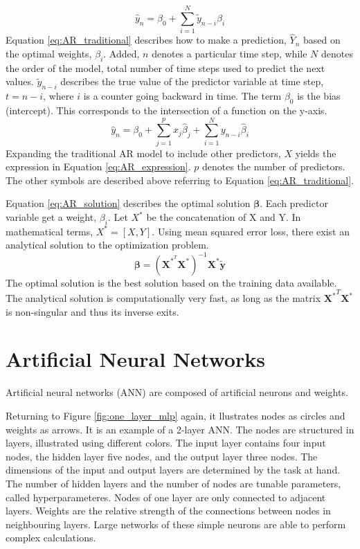\documentclass{article}
\begin{document}
\begin{equation} \label{eq:AR_traditional}
    \hat{y}_n = \beta_0 + \sum_{i = 1}^{N} \tilde{y}_{n-i} \beta_{i}
\end{equation}
Equation \eqref{eq:AR_traditional} describes how to make a prediction, $\hat{Y}_n$ based on the optimal weights, $\beta_i$. Added, $n$ denotes a particular time step, while $N$ denotes the order of the model, total number of time steps used to predict the next values. $\tilde{y}_{n-i}$ describes the true value of the predictor variable at time step, $t=n-i$, where $i$ is a counter going backward in time. The term $\beta_0$ is the bias (intercept). This corresponds to the intersection of a function on the y-axis.
\begin{equation} \label{eq:AR_expression}
    \hat{y}_n = \beta_0 + \sum_{j=1}^p x_j\hat{\beta}_j + \sum_{i = 1}^{N} y_{n-i}\hat{\beta}_{i}
\end{equation}
Expanding the traditional AR model to include other predictors, $X$ yields the expression in Equation \eqref{eq:AR_expression}. $p$ denotes the number of predictors. The other symbols are described above referring to Equation \eqref{eq:AR_traditional}.

Equation \eqref{eq:AR_solution} describes the optimal solution $\mathbf{\beta}$. Each predictor variable get a weight, $\beta_i$. Let $X^*$ be the concatenation of X and Y. In mathematical terms, $X^*=[X, Y]$. Using mean squared error loss, there exist an analytical solution to the optimization problem. 
\begin{equation} \label{eq:AR_solution}
    \mathbf{\beta}  = \left( \mathbf{X}^{*^T}\mathbf{X}^* \right)^{-1}\mathbf{X}^*\tilde{\mathbf{y}}
\end{equation}
The optimal solution is the best solution based on the training data available. The analytical solution is computationally very fast, as long as the matrix ${\mathbf{X}^*}^T\mathbf{X}^*$ is non-singular and thus its inverse exits.

\section{Artificial Neural Networks} \label{sec:artificial neural networks}
Artificial neural networks (ANN) are composed of artificial neurons and weights.  

Returning to Figure \ref{fig:one_layer_mlp} again, it llustrates nodes as circles and weights as arrows. It is an example of a 2-layer ANN. The nodes are structured in layers, illustrated using different colors. The input layer contains four input nodes, the hidden layer five nodes, and the output layer three nodes. The dimensions of the input and output layers are determined by the task at hand. The number of hidden layers and the number of nodes are tunable parameters, called hyperparameteres. Nodes of one layer are only connected to adjacent layers. Weights are the relative strength of the connections between nodes in neighbouring layers. %
Large networks of these simple neurons are able to perform complex calculations. 

\end{document}
